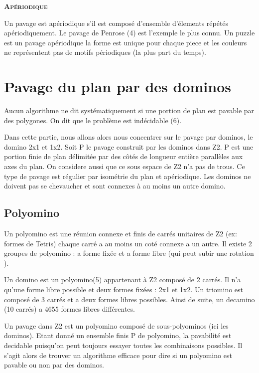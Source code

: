 \documentclass{article}
\begin{document}
\textbf{\textsc{Apériodique}}

Un pavage est apériodique s'il est composé d'ensemble d'élements répétés apériodiquement.
Le pavage de Penrose (4) est l'exemple le plus connu.
Un puzzle est un pavage apériodique la forme est unique pour chaque piece et les couleurs ne représentent pas de motifs périodiques (la plus part du temps).



\section{Pavage du plan par des dominos}

Aucun algorithme ne dit systématiquement si une portion de plan est pavable par des polygones.
On dit que le problème est indécidable (6).

Dans cette partie, nous allons alors nous concentrer sur le pavage par dominos, le domino 2x1 et 1x2.
Soit P le pavage construit par les dominos dans Z2. P est une portion finie de plan délimitée par des côtés de longueur entière parallèles aux axes du plan.
On considere aussi que ce sous espace de Z2 n’a pas de trous. Ce type de pavage est régulier par isométrie du plan et apériodique.
Les dominos ne doivent pas se chevaucher et sont connexes à au moins un autre domino.

\subsection{Polyomino}

Un polyomino est une réunion connexe et finis de carrés unitaires de Z2 (ex: formes de Tetris) chaque carré a au moins un coté connexe a un autre.
Il existe 2 groupes de polyomino : a forme fixée et a forme libre (qui peut subir une rotation ).

Un domino est un polyomino(5) appartenant à Z2 composé de 2 carrés. Il n’a qu’une forme libre possible et deux formes fixées : 2x1 et 1x2.
Un triomino est composé de 3 carrés et a deux formes libres possibles.
Ainsi de suite, un decamino (10 carrés) a 4655 formes libres différentes.

Un pavage dans Z2 est un polyomino composé de sous-polyominos (ici les dominos).
Etant donné un ensemble finis P de polyomino, la pavabilité est decidable puisqu'on peut toujours essayer toutes les combinaisons possibles.
Il s'agit alors de trouver un algorithme efficace pour dire si un polyomino est pavable ou non par des dominos.
\end{document}

